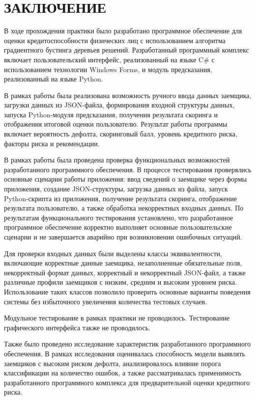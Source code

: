 \section*{ЗАКЛЮЧЕНИЕ}

В ходе прохождения практики было разработано программное обеспечение для оценки кредитоспособности физических лиц с использованием алгоритма градиентного бустинга деревьев решений. Разработанный программный комплекс включает пользовательский интерфейс, реализованный на языке C\# с использованием технологии Windows Forms, и модуль предсказания, реализованный на языке Python.

В рамках работы была реализована возможность ручного ввода данных заемщика, загрузки данных из JSON-файла, формирования входной структуры данных, запуска Python-модуля предсказания, получения результата скоринга и отображения итоговой оценки пользователю. Результат работы программы включает вероятность дефолта, скоринговый балл, уровень кредитного риска, факторы риска и рекомендации.

В рамках работы была проведена проверка функциональных возможностей разработанного программного обеспечения. В процессе тестирования проверялись основные сценарии работы приложения: ввод сведений о заемщике через формы приложения, создание JSON-структуры, загрузка данных из файла, запуск Python-скрипта из приложения, получение результата скоринга, отображение результата пользователю, а также обработка некорректных входных данных. По результатам функционального тестирования установлено, что разработанное программное обеспечение корректно выполняет основные пользовательские сценарии и не завершается аварийно при возникновении ошибочных ситуаций.

Для проверки входных данных были выделены классы эквивалентности, включающие корректные данные заемщика, незаполненные обязательные поля, некорректный формат данных, корректный и некорректный JSON-файл, а также различные профили заемщиков с низким, средним и высоким уровнем риска. Использование таких классов позволило проверить основные варианты поведения системы без избыточного увеличения количества тестовых случаев.

Модульное тестирование в рамках практики не проводилось. Тестирование графического интерфейса также не проводилось.

Также было проведено исследование характеристик разработанного программного обеспечения. В рамках исследования оценивалась способность модели выявлять заемщиков с высоким риском дефолта, анализировалось влияние порога классификации на количество ошибок, а также рассматривалась применимость разработанного программного комплекса для предварительной оценки кредитного риска.


